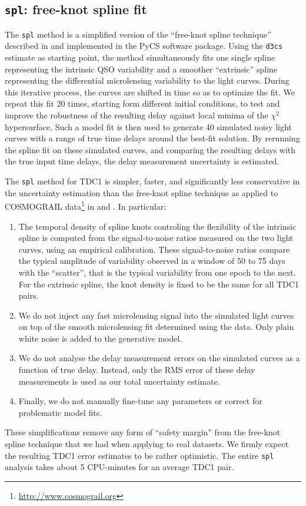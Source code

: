 \documentclass[traditabstract]{aa}
\begin{document}
\subsection{{\tt spl}: free-knot spline fit}
The {\tt spl} method is a simplified version of the ``free-knot spline technique'' described in \citet{pycs} and implemented in the PyCS software package. Using the {\tt d3cs} estimate as starting point, the method simultaneously fits one single spline representing the intrinsic QSO variability and a smoother ``extrinsic'' spline representing the differential microlensing variability to the light curves. During this iterative process, the curves are shifted in time so as to optimize the fit. We repeat this fit 20 times, starting form different initial conditions, to test and improve the robustness of the resulting delay against local minima of the $\chi^2$ hypersurface. Such a model fit is then used to generate 40 simulated noisy light curves with a range of true time delays around the best-fit solution. By rerunning the spline fit on these simulated curves, and comparing the resulting delays with the true input time delays, the delay measurement uncertainty is estimated.

The {\tt spl} method for TDC1 is simpler, faster, and significantly less conservative in the uncertainty estimation than the free-knot spline technique as applied to COSMOGRAIL data\footnote{\url{http://www.cosmograil.org}} in \citet{Tewes:2013iz} and \citet{RathnaKumar:2013eu}. In particular:
\begin{enumerate}
\item The temporal density of spline knots controling the flexibility of the intrinsic spline is computed from the signal-to-noise ratios measured on the two light curves, using an empirical calibration. These signal-to-noise ratios compare the typical amplitude of variability observed in a window of 50 to 75 days with the ``scatter'', that is the typical variability from one epoch to the next. For the extrinsic spline, the knot density is fixed to be the same for all TDC1 pairs.
\item We do not inject any fast microlensing signal into the simulated light curves on top of the smooth microlensing fit determined using the data. Only plain white noise is added to the generative model. 
\item We do not analyse the delay measurement errors on the simulated curves as a function of true delay. Instead, only the RMS error of these delay measurements is used as our total uncertainty estimate. 
\item Finally, we do not manually fine-tune any parameters or correct for problematic model fits. 
\end{enumerate}
These simplifications remove any form of ``safety margin'' from the free-knot spline technique that we had when applying to real datasets. We firmly expect the resulting TDC1 error estimates to be rather optimistic. The entire {\tt spl} analysis takes about 5 CPU-minutes for an average TDC1 pair.  
\end{document}
